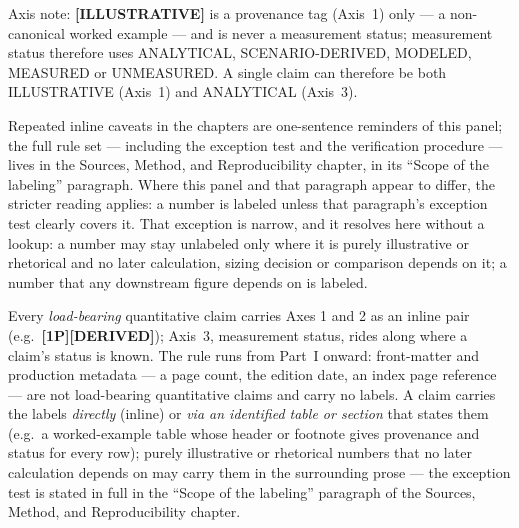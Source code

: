 \begin{center}
{{\par\vspace{3.5pt}\noindent Axis note: \textbf{[ILLUSTRATIVE]} is a provenance tag (Axis~1) only --- a non-canonical worked example --- and is never a measurement status; measurement status therefore uses ANALYTICAL, SCENARIO-DERIVED, MODELED, MEASURED or UNMEASURED. A single claim can therefore be both ILLUSTRATIVE (Axis~1) and ANALYTICAL (Axis~3).
\par\vspace{3.5pt}\noindent Repeated inline caveats in the chapters are one-sentence reminders of this panel; the full rule set --- including the exception test and the verification procedure --- lives in the Sources, Method, and Reproducibility chapter, in its ``Scope of the labeling'' paragraph. Where this panel and that paragraph appear to differ, the stricter reading applies: a number is labeled unless that paragraph's exception test clearly covers it. That exception is narrow, and it resolves here without a lookup: a number may stay unlabeled only where it is purely illustrative or rhetorical and no later calculation, sizing decision or comparison depends on it; a number that any downstream figure depends on is labeled.}}
\end{center}

Every \emph{load-bearing} quantitative claim carries Axes 1 and 2 as an
inline pair (e.g.\ \textbf{[1P][DERIVED]}); Axis~3, measurement status, rides
along where a claim's status is known. The rule runs from Part~I onward:
front-matter and production metadata --- a page count, the edition date, an
index page reference --- are not load-bearing quantitative claims and carry
no labels. A claim carries the labels
\emph{directly} (inline) or \emph{via an identified table or section} that
states them (e.g.\ a worked-example table whose header or footnote gives
provenance and status for every row); purely illustrative or rhetorical
numbers that no later calculation depends on may carry them in the
surrounding prose --- the exception test is stated in full in the ``Scope of the labeling'' paragraph of the Sources,
Method, and Reproducibility chapter.

